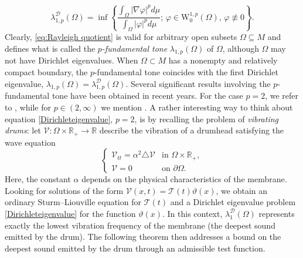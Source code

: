 \documentclass{article}
\begin{document}
\begin{equation}\label{eq:Rayleigh quotient}
    \lambda_{1,p}^{\mathcal{D}}(\Omega)
    = \inf \left\{ \frac{\displaystyle \int_{\Omega} |\nabla \varphi |^p d\mu} {\displaystyle \int_{\Omega} |\varphi|^p d\mu}; \, \varphi \in \mathrm{W}^{1,p}_0(\Omega), \, \varphi \not\equiv 0
    \right\}.
\end{equation} Clearly,  \eqref{eq:Rayleigh quotient} is valid for  arbitrary open subsets $\Omega \subseteq M$ and defines what is called the \emph{$p$-fundamental tone} $\lambda_{1,p}(\Omega)$ of  $\Omega $, although $\Omega$ may not have Dirichlet eigenvalues.
When $\Omega \subset M$ has a nonempty and relatively compact boundary, the $p$-fundamental tone coincides with the first Dirichlet eigenvalue,  $\lambda_{1,p}(\Omega) = \lambda_{1,p}^{\mathcal{D}}(\Omega).$ Several significant results involving the $p$-fundamental tone have been obtained in recent years. For the case $p=2$, we refer to \cite{BessaMontenegro, BessaMontenegro2003}, while for $p \in (2,\infty)$ we mention \cite{LimaMontenegroSantos2010, Mao2014, matei}. A rather interesting way to think about equation \eqref{Dirichleteigenvalue},  $p=2$,  is by recalling the problem of \textit{vibrating drums}: let $\mathcal{V} \colon \Omega \times \mathbb{R}_+ \to \mathbb{R}$ describe the vibration of a drumhead satisfying the wave equation
\begin{equation}\label{SoundEquation}
\begin{cases}
\mathcal{V}_{tt} = \alpha^2 \triangle \mathcal{V}
& \text{in } \Omega \times \mathbb{R}_+,\\
\mathcal{V} = 0
& \text{on } \partial\Omega.
\end{cases}
\end{equation}
Here, the constant $\alpha$ depends on the physical characteristics of the membrane. 
Looking for solutions of the form $\mathcal{V}(x,t) = \mathcal{T}(t)\vartheta(x)$, we obtain an ordinary Sturm--Liouville equation for $\mathcal{T}(t)$ and a Dirichlet eigenvalue problem \eqref{Dirichleteigenvalue} for the function $\vartheta(x)$. 
In this context, $\lambda_{1}^{\mathcal{D}}(\Omega)$ represents exactly the lowest vibration frequency of the membrane (the deepest sound emitted by the drum). 
The following theorem then addresses a bound on the deepest sound emitted by the drum through an admissible test function.
\end{document}
